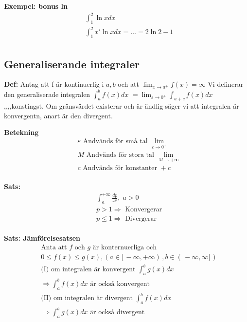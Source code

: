 \begin{multicols}{2}
\textbf{Exempel: bonus ln}
\begin{align*}
  &\int_1^2 \ln{x} dx \\
  &\int_1^2 x'\ln{x} dx = \ldots =2\ln{2}-1\\
\end{align*}



\subsection{Generaliserande integraler}
\textbf{Def: }
Antag att f är kontinuerlig i $a,b$ och att $\lim_{x \to a^+} f(x) = \infty$
Vi definerar den generaliserade integralen $\int_a^b f(x) dx$
$= \lim_{\varepsilon \to 0^+} \int_{a+c}f(x) dx$ ,,,,konstingst.
Om gränsvärdet existerar och är ändlig säger vi att integralen är konvergentn,
anart är den divergent.

\textbf{Betekning}
\begin{align*}
  &\varepsilon \text{ Andvänds för små tal }  \lim_{\varepsilon \to 0^+} \\
  &M \text{ Andvänds för stora tal } \lim_{M \to +\infty} \\
  &c \text{ Andvänds för konstanter } +c \\
\end{align*}

\textbf{Sats: }
\begin{align*}
  &\int_a^{+\infty} \frac{dp}{x^p}, \; a>0 \\
  &p > 1 \Rightarrow \text{ Konvergerar} \\
  &p \leq 1 \Rightarrow \text{ Divergerar} \\
\end{align*}

\textbf{Sats: Jämförelsesatsen}
\begin{align*}
  &\text{Anta att $f$ och $g$ är konternuerliga och } \\
  &0 \leq f(x) \leq g(x), ( a \in [ \, -\infty,+\infty ) \, , b \in ( \, -\infty,\infty ] \, ) \\
  &\text{(I) om integralen är konvergent } \int_a^b g(x)dx \\
  &\Rightarrow \int_a^b f(x)dx \text{ är också konvergent} \\
  &\text{(II) om integralen är divergent } \int_a^b f(x)dx \\
  &\Rightarrow \int_a^b g(x)dx \text{ är också divergent} \\
\end{align*}


\end{multicols}
